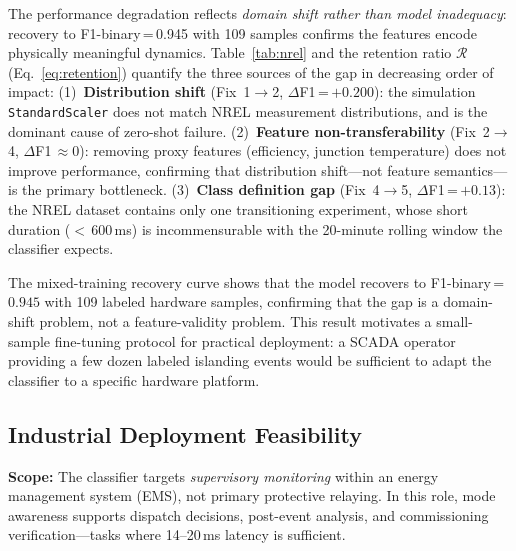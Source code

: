 \documentclass[journal]{IEEEtran}
\begin{document}
The performance degradation reflects \emph{domain shift rather than
model inadequacy}: recovery to F1-binary\,=\,0.945 with 109 samples
confirms the features encode physically meaningful dynamics.
Table~\ref{tab:nrel} and the retention ratio $\mathcal{R}$ (Eq.~\ref{eq:retention})
quantify the three sources of the gap in decreasing order of impact:
(1)~\textbf{Distribution shift} (Fix~1$\rightarrow$2, $\Delta$F1\,=\,$+0.200$):
the simulation \texttt{StandardScaler} does not match NREL measurement
distributions, and is the dominant cause of zero-shot failure.
(2)~\textbf{Feature non-transferability} (Fix~2$\rightarrow$4,
$\Delta$F1\,$\approx 0$): removing proxy features (efficiency, junction
temperature) does not improve performance, confirming that distribution
shift---not feature semantics---is the primary bottleneck.
(3)~\textbf{Class definition gap} (Fix~4$\rightarrow$5, $\Delta$F1\,=\,$+0.13$):
the NREL dataset contains only one transitioning experiment, whose short
duration ($<$\,600\,ms) is incommensurable with the 20-minute rolling
window the classifier expects.

The mixed-training recovery curve shows that the model recovers to
F1-binary\,=\,$0.945$ with 109 labeled hardware samples, confirming that
the gap is a domain-shift problem, not a feature-validity problem.
This result motivates a small-sample fine-tuning protocol for practical
deployment: a SCADA operator providing a few dozen labeled islanding events
would be sufficient to adapt the classifier to a specific hardware platform.

\subsection{Industrial Deployment Feasibility}
\label{sec:deployment}

\textbf{Scope:} The classifier targets \emph{supervisory monitoring}
within an energy management system (EMS), not primary protective relaying.
In this role, mode awareness supports dispatch decisions, post-event
analysis, and commissioning verification---tasks where 14--20\,ms
latency is sufficient.
\end{document}
